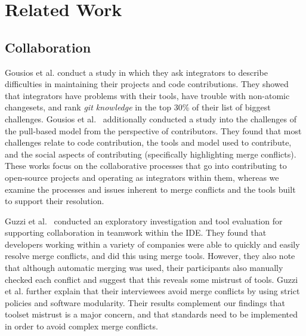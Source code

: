 
\section{Related Work}\label{related_work}

\subsection{Collaboration}

Gousios et al. \cite{integrator_perspective} conduct a study in which they ask integrators to describe difficulties in maintaining their projects and code contributions. 
They showed that integrators have problems with their tools, have trouble with non-atomic changesets, and rank \textit{git knowledge} in the top 30\% of their list of biggest challenges. 
Gousios et al.~\cite{gousios2016work} additionally conducted a study into the challenges of the pull-based model from the perspective of contributors. 
They found that most challenges relate to code contribution, the tools and model used to contribute, and the social aspects of contributing (specifically highlighting merge conflicts).
These works focus on the collaborative processes that go into contributing to open-source projects and operating as integrators within them, whereas we examine the processes and issues inherent to merge conflicts and the tools built to support their resolution.

Guzzi et al.~\cite{Guzzi2015} conducted an exploratory investigation and tool evaluation for supporting collaboration in teamwork within the IDE.
They found that developers working within a variety of companies were able to quickly and easily resolve merge conflicts, and did this using merge tools.
However, they also note that although automatic merging was used, their participants also manually checked each conflict and suggest that this reveals some mistrust of tools.
Guzzi et al. further explain that their interviewees avoid merge conflicts by using strict policies and software modularity.
Their results complement our findings that toolset mistrust is a major concern, and that standards need to be implemented in order to avoid complex merge conflicts.

